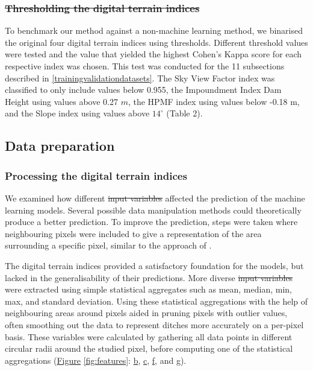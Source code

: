 \documentclass[11pt, review]{elsarticle} %
\providecommand{\DIFaddtex}[1]{{\protect\color{blue}\uwave{#1}}} %
\providecommand{\DIFdeltex}[1]{{\protect\color{red}\sout{#1}}}                      %
\providecommand{\DIFaddbegin}{} %
\providecommand{\DIFaddend}{} %
\providecommand{\DIFdelbegin}{} %
\providecommand{\DIFdelend}{} %
\providecommand{\DIFadd}[1]{\texorpdfstring{\DIFaddtex{#1}}{#1}} %
\providecommand{\DIFdel}[1]{\texorpdfstring{\DIFdeltex{#1}}{}} %
\begin{document}
\DIFdelbegin \subsubsection{\DIFdel{Thresholding the digital terrain indices}}
\addtocounter{subsubsection}{-1}%
\DIFdelend To benchmark our method against a non-machine learning method, we binarised the original four digital terrain indices using thresholds. Different threshold values were tested and the value that yielded the highest Cohen's Kappa score for each respective index was chosen. This test was conducted for the 11 subsections described in \ref{trainingvalidationdatasets}. The Sky View Factor index was classified to only include values below 0.955, the Impoundment Index Dam Height using values above 0.27 $m$, the HPMF index using values below -0.18 m, and the Slope index using values above $14 ^{\circ}$ (Table 2).

\subsection{Data preparation}

\subsubsection{Processing the digital terrain indices}
We examined how different  \DIFdelbegin \DIFdel{input variables }\DIFdelend \DIFaddbegin \DIFadd{features }\DIFaddend affected the prediction of the machine learning models. Several possible data manipulation methods could theoretically produce a better prediction. To improve the prediction, steps were taken where neighbouring pixels were included to give a representation of the area surrounding a specific pixel, similar to the approach of \citet{roelens}. 

The digital terrain indices provided a satisfactory foundation for the models, but lacked in the generalisability of their predictions. More diverse \DIFdelbegin \DIFdel{input variables }\DIFdelend \DIFaddbegin \DIFadd{features }\DIFaddend were extracted using simple statistical aggregates such as mean, median, min, max, and standard deviation. Using these statistical aggregations with the help of neighbouring areas around pixels aided in pruning pixels with outlier values, often smoothing out the data to represent ditches more accurately on a per-pixel basis. These variables were calculated by gathering all data points in different circular radii around the studied pixel, before computing one of the statistical aggregations (\hyperref[fig:features]{Figure} \ref{fig:features}: \hyperref[fig:features]{b}, \hyperref[fig:features]{c}, \hyperref[fig:features]{f}, and \hyperref[fig:features]{g}).
\end{document}
